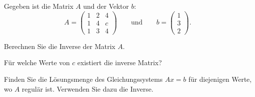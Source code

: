 Gegeben ist die Matrix $A$ und der Vektor $b$:
\[
A
=
\begin{pmatrix}
1&2&4\\
1&4&c\\
1&3&4
\end{pmatrix}
\qquad
\text{und}
\qquad
b=\begin{pmatrix}1\\3\\2\end{pmatrix}.
\]
\begin{teilaufgaben}
\item
Berechnen Sie die Inverse der Matrix $A$.
\item
Für welche Werte von $c$ existiert die inverse Matrix?
\item
Finden Sie die Lösungsmenge des Gleichungssystems $Ax=b$ für diejenigen
Werte, wo $A$ regulär ist. Verwenden Sie dazu die Inverse.
\end{teilaufgaben}

